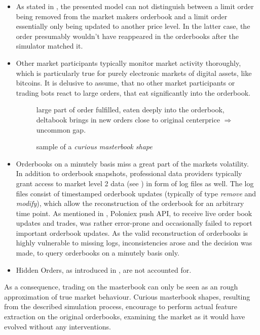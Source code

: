 \begin{itemize}
\item As stated in , the presented model can not distinguish between a limit order being removed from the market makers orderbook and a limit order essentially only being updated to another price level. In the latter case, the order presumably wouldn't have reappeared in the orderbooks after the simulator matched it.
\item Other market participants typically monitor market activity thoroughly, which is particularly true for purely electronic markets of digital assets, like bitcoins. It is delusive to assume, that no other market participants or trading bots react to large orders, that eat significantly into the orderbook.\\

\begin{figure}[ht]
	\centering
	[placeholder]
	\caption{sample of a \emph{curious masterbook shape}}
	large part of order fulfilled, eaten deeply into the orderbook, deltabook brings in new orders close to original centerprice $\Rightarrow$ uncommon gap.
	\label{fig:masterbook:curiousshape}
\end{figure}

\item Orderbooks on a minutely basis miss a great part of the markets volatility. \\
In addition to orderbook snapshots, professional data providers typically grant access to market level 2 data (see ) in form of log files as well. The log files consist of timestamped orderbook updates (typically of type \emph{remove} and \emph{modify}), which allow the reconstruction of the orderbook for an arbitrary time point. As mentioned in , Poloniex push API, to receive live order book updates and trades, was rather error-prone and occasionally failed to report important orderbook updates. As the valid reconstruction of orderbooks is highly vulnerable to missing logs, inconsistencies arose and the decision was made, to query orderbooks on a minutely basis only.
\item Hidden Orders, as introduced in , are not accounted for.
\end{itemize}

As a consequence, trading on the masterbook can only be seen as an rough approximation of true market behaviour. Curious masterbook shapes, resulting from the described simulation process, encourage to perform actual feature extraction on the original orderbooks, examining the market as it would have evolved without any interventions.







\cleardoublepage{}